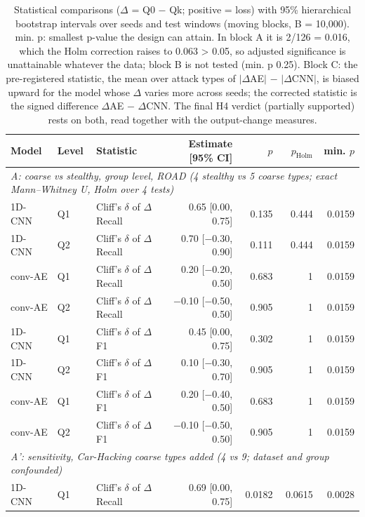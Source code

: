 \begin{table}[t]
\centering
\footnotesize
\setlength{\tabcolsep}{2.5pt}
\caption{Statistical comparisons ($\Delta$ = Q0 $-$ Qk; positive = loss) with 95\% hierarchical bootstrap intervals over seeds and test windows (moving blocks, B = 10,000). min. p: smallest p-value the design can attain. In block A it is 2/126 = 0.016, which the Holm correction raises to 0.063 > 0.05, so adjusted significance is unattainable whatever the data; block B is not tested (min. p 0.25). Block C: the pre-registered statistic, the mean over attack types of $|\Delta$AE$|$ $-$ $|\Delta$CNN$|$, is biased upward for the model whose $\Delta$ varies more across seeds; the corrected statistic is the signed difference $\Delta$AE $-$ $\Delta$CNN. The final H4 verdict (partially supported) rests on both, read together with the output-change measures.}
\label{tab:stats}
\begin{tabular}{@{}lllrrrr@{}}
\toprule
Model & Level & Statistic & Estimate [95\% CI] & $p$ & $p_\mathrm{Holm}$ & min. $p$ \\
\midrule
\multicolumn{7}{l}{\textit{A: coarse vs stealthy, group level, ROAD (4 stealthy vs 5 coarse types; exact Mann--Whitney U, Holm over 4 tests)}} \\
1D-CNN & Q1 & Cliff's $\delta$ of $\Delta$Recall & 0.65 [0.00, 0.75] & 0.135 & 0.444 & 0.0159 \\
1D-CNN & Q2 & Cliff's $\delta$ of $\Delta$Recall & 0.70 [$-$0.30, 0.90] & 0.111 & 0.444 & 0.0159 \\
conv-AE & Q1 & Cliff's $\delta$ of $\Delta$Recall & 0.20 [$-$0.20, 0.50] & 0.683 & 1 & 0.0159 \\
conv-AE & Q2 & Cliff's $\delta$ of $\Delta$Recall & $-$0.10 [$-$0.50, 0.50] & 0.905 & 1 & 0.0159 \\
1D-CNN & Q1 & Cliff's $\delta$ of $\Delta$F1 & 0.45 [0.00, 0.75] & 0.302 & 1 & 0.0159 \\
1D-CNN & Q2 & Cliff's $\delta$ of $\Delta$F1 & 0.10 [$-$0.30, 0.70] & 0.905 & 1 & 0.0159 \\
conv-AE & Q1 & Cliff's $\delta$ of $\Delta$F1 & 0.20 [$-$0.40, 0.50] & 0.683 & 1 & 0.0159 \\
conv-AE & Q2 & Cliff's $\delta$ of $\Delta$F1 & $-$0.10 [$-$0.50, 0.50] & 0.905 & 1 & 0.0159 \\
\midrule
\multicolumn{7}{l}{\textit{A': sensitivity, Car-Hacking coarse types added (4 vs 9; dataset and group confounded)}} \\
1D-CNN & Q1 & Cliff's $\delta$ of $\Delta$Recall & 0.69 [0.00, 0.75] & 0.0182 & 0.0615 & 0.0028 \\

\end{tabular}
\end{table}
